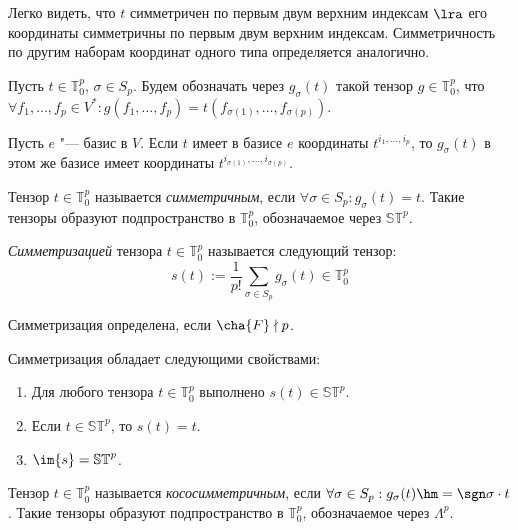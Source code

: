 \begin{note}
    Легко видеть, что $t$ симметричен по первым двум верхним индексам $\lra$ его координаты симметричны по первым двум верхним индексам. Симметричность по другим наборам координат одного типа определяется аналогично.
\end{note}

\begin{definition}
    Пусть $t \in \mathbb{T}^p_0$, $\sigma \in S_p$. Будем обозначать через $g_\sigma(t)$ такой тензор $g \in \mathbb{T}^p_0$, что $\forall f_1, \dotsc, f_p \in V^*: g(f_1, \dots, f_p) = t(f_{\sigma(1)}, \dots, f_{\sigma(p)})$.
\end{definition}

\begin{note}
    Пусть $e$ "--- базис в $V$. Если $t$ имеет в базисе $e$ координаты $t^{i_1, \dots, i_p}$, то $g_\sigma(t)$ в этом же базисе имеет координаты $t^{i_{\sigma(1)}, \dots, i_{\sigma(p)}}$.
\end{note}

\begin{definition}
    Тензор $t \in \mathbb{T}^p_0$ называется \textit{симметричным}, если $\forall \sigma \in S_p: g_\sigma(t) = t$. Такие тензоры образуют подпространство в $\mathbb{T}^p_0$, обозначаемое через $\mathbb{ST}^p$.
\end{definition}

\begin{definition}
    \textit{Симметризацией} тензора $t \in \mathbb{T}^p_0$ называется следующий тензор:
    \[s(t) := \frac1{p!}\sum_{\sigma \in S_p}g_\sigma(t) \in \mathbb{T}^p_0\]
    
    Симметризация определена, если $\cha{F} \nmid p$.
\end{definition}

\begin{proposition} Симметризация обладает следующими свойствами:
    \begin{enumerate}
        \item Для любого тензора $t \in \mathbb{T}^p_0$ выполнено $s(t) \in \mathbb{ST}^p$.
        \item Если $t \in \mathbb{ST}^p$, то $s(t) = t$.
        \item $\im{s} = \mathbb{ST}^p$.
    \end{enumerate}
\end{proposition}

\begin{definition}
    Тензор $t \in \mathbb{T}^p_0$ называется \textit{кососимметричным}, если $\forall \sigma \in S_p: g_\sigma(t) \hm= \sgn\sigma\cdot t$. Такие тензоры образуют подпространство в $\mathbb{T}^p_0$, обозначаемое через $\Lambda^p$.
\end{definition}

